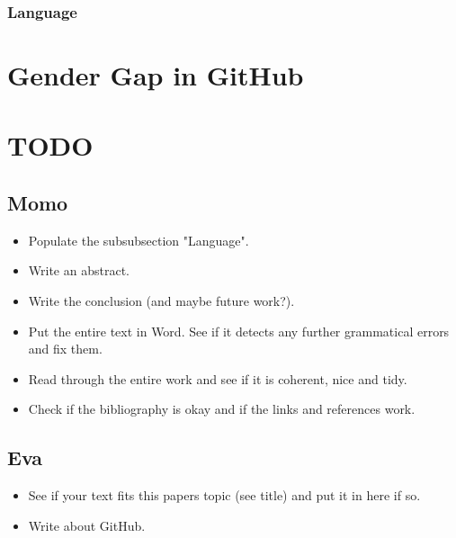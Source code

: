 \documentclass[a4paper, 11pt]{article}
\begin{document}
\subsubsection{Language} \label{sec:gender-gap-wikipedia:language}

\section{Gender Gap in GitHub} \label{sec:gender-gap-github}

\section{TODO}

\subsection{Momo}

\begin{itemize}
  \item Populate the subsubsection "Language".
  \item Write an abstract.
  \item Write the conclusion (and maybe future work?).
  \item Put the entire text in Word. See if it detects any further grammatical errors and fix them.
  \item Read through the entire work and see if it is coherent, nice and tidy.
  \item Check if the bibliography is okay and if the links and references work.
\end{itemize}

\subsection{Eva}

\begin{itemize}
  \item See if your text fits this papers topic (see title) and put it in here if so.
  \item Write about GitHub.
\end{itemize}




\doclicenseThis
\end{document}
